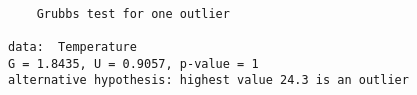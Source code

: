 \begin{verbatim} 

	Grubbs test for one outlier

data:  Temperature
G = 1.8435, U = 0.9057, p-value = 1
alternative hypothesis: highest value 24.3 is an outlier

\end{verbatim}